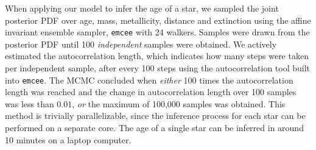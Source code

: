 
When applying our model to infer the age of a star, we sampled the joint
posterior PDF over age, mass, metallicity, distance and extinction using the
affine invariant ensemble sampler, {\tt emcee} \citep{foreman-mackey2013} with
24 walkers.
Samples were drawn from the posterior PDF until 100 {\it independent} samples
were obtained.
We actively estimated the autocorrelation length, which indicates how many
steps were taken per independent sample, after every 100 steps using the
autocorrelation tool built into {\tt emcee}.
The MCMC concluded when {\it either} 100 times the autocorrelation length was
reached and the change in autocorrelation length over 100 samples was less
than 0.01, {\it or} the maximum of 100,000 samples was obtained.
This method is trivially parallelizable, since the inference process for each
star can be performed on a separate core.
The age of a single star can be inferred in around 10 minutes on a laptop
computer.

